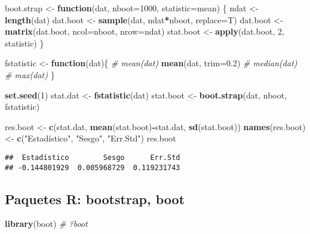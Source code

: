 \documentclass[
]{book}
\newenvironment{Shaded}{\begin{snugshade}}{\end{snugshade}}
\newcommand{\CommentTok}[1]{\textcolor[rgb]{0.56,0.35,0.01}{\textit{#1}}}
\newcommand{\ControlFlowTok}[1]{\textcolor[rgb]{0.13,0.29,0.53}{\textbf{#1}}}
\newcommand{\DataTypeTok}[1]{\textcolor[rgb]{0.13,0.29,0.53}{#1}}
\newcommand{\DecValTok}[1]{\textcolor[rgb]{0.00,0.00,0.81}{#1}}
\newcommand{\FloatTok}[1]{\textcolor[rgb]{0.00,0.00,0.81}{#1}}
\newcommand{\KeywordTok}[1]{\textcolor[rgb]{0.13,0.29,0.53}{\textbf{#1}}}
\newcommand{\NormalTok}[1]{#1}
\newcommand{\OperatorTok}[1]{\textcolor[rgb]{0.81,0.36,0.00}{\textbf{#1}}}
\newcommand{\StringTok}[1]{\textcolor[rgb]{0.31,0.60,0.02}{#1}}
\theoremstyle{break}
\theoremstyle{definition}
\theoremstyle{definition}
\theoremstyle{definition}
\theoremstyle{remark}
\begin{document}
\begin{Shaded}
\begin{Highlighting}[]
\NormalTok{boot.strap <-}\StringTok{ }\ControlFlowTok{function}\NormalTok{(dat, }\DataTypeTok{nboot=}\DecValTok{1000}\NormalTok{, }\DataTypeTok{statistic=}\NormalTok{mean)}
\NormalTok{\{}
\NormalTok{  ndat <-}\StringTok{ }\KeywordTok{length}\NormalTok{(dat)}
\NormalTok{  dat.boot <-}\StringTok{ }\KeywordTok{sample}\NormalTok{(dat, ndat}\OperatorTok{*}\NormalTok{nboot, }\DataTypeTok{replace=}\NormalTok{T)}
\NormalTok{  dat.boot <-}\StringTok{ }\KeywordTok{matrix}\NormalTok{(dat.boot, }\DataTypeTok{ncol=}\NormalTok{nboot, }\DataTypeTok{nrow=}\NormalTok{ndat)}
\NormalTok{  stat.boot <-}\StringTok{ }\KeywordTok{apply}\NormalTok{(dat.boot, }\DecValTok{2}\NormalTok{, statistic)}
\NormalTok{\}}

\NormalTok{fstatistic <-}\StringTok{ }\ControlFlowTok{function}\NormalTok{(dat)\{}
  \CommentTok{#  mean(dat)}
  \KeywordTok{mean}\NormalTok{(dat, }\DataTypeTok{trim=}\FloatTok{0.2}\NormalTok{)}
  \CommentTok{#  median(dat)}
  \CommentTok{#  max(dat)}
\NormalTok{\}}

\KeywordTok{set.seed}\NormalTok{(}\DecValTok{1}\NormalTok{)}
\NormalTok{stat.dat <-}\StringTok{ }\KeywordTok{fstatistic}\NormalTok{(dat)}
\NormalTok{stat.boot <-}\StringTok{ }\KeywordTok{boot.strap}\NormalTok{(dat, nboot, fstatistic)}

\NormalTok{res.boot <-}\StringTok{ }\KeywordTok{c}\NormalTok{(stat.dat, }\KeywordTok{mean}\NormalTok{(stat.boot)}\OperatorTok{-}\NormalTok{stat.dat, }\KeywordTok{sd}\NormalTok{(stat.boot))}
\KeywordTok{names}\NormalTok{(res.boot) <-}\StringTok{ }\KeywordTok{c}\NormalTok{(}\StringTok{"Estadístico"}\NormalTok{, }\StringTok{"Sesgo"}\NormalTok{, }\StringTok{"Err.Std"}\NormalTok{)}
\NormalTok{res.boot}
\end{Highlighting}
\end{Shaded}

\begin{verbatim}
##  Estadístico        Sesgo      Err.Std 
## -0.144801929  0.005968729  0.119231743
\end{verbatim}

\hypertarget{paquetes-r-bootstrap-boot}{%
\subsection{Paquetes R: bootstrap, boot}\label{paquetes-r-bootstrap-boot}}

\begin{Shaded}
\begin{Highlighting}[]
\KeywordTok{library}\NormalTok{(boot)}
\CommentTok{# ?boot}
\end{Highlighting}
\end{Shaded}
\end{document}
